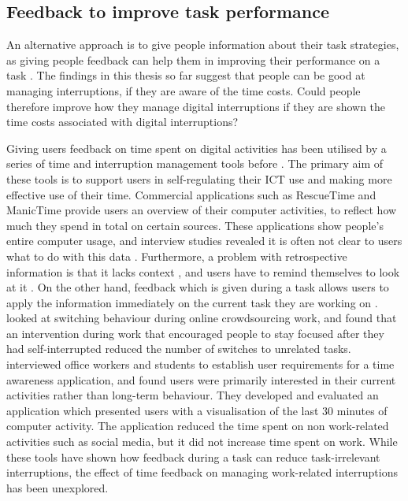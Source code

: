 \subsection{Feedback to improve task performance}
An alternative approach is to give people information about their task strategies, as giving people feedback can help them in improving their performance on a task \citep{Maior2018, Farmer2017}. The findings in this thesis so far suggest that people can be good at managing interruptions, if they are aware of the time costs. Could people therefore improve how they manage digital interruptions if they are shown the time costs associated with digital interruptions? 

Giving users feedback on time spent on digital activities has been utilised by a series of time and interruption management tools before \citep{Lyngs2018}. The primary aim of these tools is to support users in self-regulating their ICT use and making more effective use of their time. Commercial applications such as RescueTime and ManicTime provide users an overview of their computer activities, to reflect how much they spend in total on certain sources. These applications show people’s entire computer usage, and interview studies revealed it is often not clear to users what to do with this data \citep{Collins2014}. Furthermore, a problem with retrospective information is that it lacks context \citep{Collins2014}, and users have to remind themselves to look at it \citep{Whittaker2016}. On the other hand, feedback which is given during a task allows users to apply the information immediately on the current task they are working on \citep{Gould2016a, Maior2018}. \citet{Gould2016a} looked at switching behaviour during online crowdsourcing work, and found that an intervention during work that encouraged people to stay focused after they had self-interrupted reduced the number of switches to unrelated tasks. \citet{Whittaker2016} interviewed office workers and students to establish user requirements for a time awareness application, and found users were primarily interested in their current activities rather than long-term behaviour. They developed and evaluated an application which presented users with a visualisation of the last 30 minutes of computer activity. The application reduced the time spent on non work-related activities such as social media, but it did not increase time spent on work. While these tools have shown how feedback during a task can reduce task-irrelevant interruptions, the effect of time feedback on managing work-related interruptions has been unexplored.

